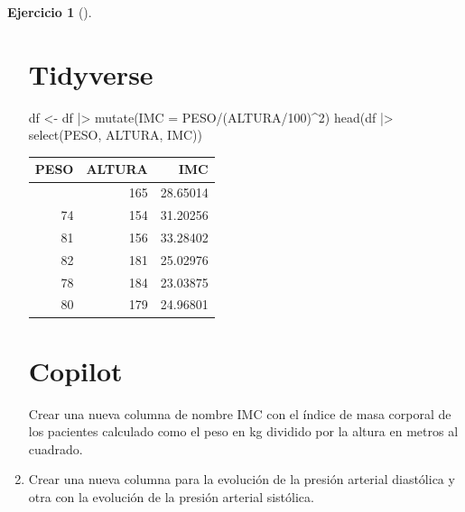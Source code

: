 \documentclass[
  a4paper,
]{scrreport}
\newenvironment{Shaded}{\begin{snugshade}}{\end{snugshade}}
\newcommand{\AttributeTok}[1]{\textcolor[rgb]{0.40,0.45,0.13}{#1}}
\newcommand{\DecValTok}[1]{\textcolor[rgb]{0.68,0.00,0.00}{#1}}
\newcommand{\ExtensionTok}[1]{\textcolor[rgb]{0.00,0.23,0.31}{#1}}
\newcommand{\FunctionTok}[1]{\textcolor[rgb]{0.28,0.35,0.67}{#1}}
\newcommand{\NormalTok}[1]{\textcolor[rgb]{0.00,0.23,0.31}{#1}}
\newcommand{\OtherTok}[1]{\textcolor[rgb]{0.00,0.23,0.31}{#1}}
\newcommand{\SpecialCharTok}[1]{\textcolor[rgb]{0.37,0.37,0.37}{#1}}
\theoremstyle{definition}
\newtheorem{exercise}{Ejercicio}[chapter]
\theoremstyle{remark}
\begin{document}
\begin{exercise}[]
\begin{enumerate}
\begin{tcolorbox}
  \section{Tidyverse}

\begin{Shaded}
\begin{Highlighting}[]
\NormalTok{df }\OtherTok{\textless{}{-}}\NormalTok{ df }\SpecialCharTok{|\textgreater{}} \FunctionTok{mutate}\NormalTok{(}\AttributeTok{IMC =}\NormalTok{ PESO}\SpecialCharTok{/}\NormalTok{(ALTURA}\SpecialCharTok{/}\DecValTok{100}\NormalTok{)}\SpecialCharTok{\^{}}\DecValTok{2}\NormalTok{)}
\FunctionTok{head}\NormalTok{(df }\SpecialCharTok{|\textgreater{}} \FunctionTok{select}\NormalTok{(PESO, ALTURA, IMC))}
\end{Highlighting}
\end{Shaded}

  \begin{longtable}[]{@{}rrr@{}}
  \toprule\noalign{}
  PESO & ALTURA & IMC \\
  \midrule\noalign{}
  \endhead
  \bottomrule\noalign{}
  \endlastfoot
  78 & 165 & 28.65014 \\
  74 & 154 & 31.20256 \\
  81 & 156 & 33.28402 \\
  82 & 181 & 25.02976 \\
  78 & 184 & 23.03875 \\
  80 & 179 & 24.96801 \\
  \end{longtable}

  \section{Copilot}

\begin{Shaded}
\begin{Highlighting}[]
\ExtensionTok{Crear}\NormalTok{ una nueva columna de nombre IMC con el índice de masa corporal de los pacientes calculado como el peso en kg dividido por la altura en metros al cuadrado.}
\end{Highlighting}
\end{Shaded}

  \end{tcolorbox}
\item
  Crear una nueva columna para la evolución de la presión arterial
  diastólica y otra con la evolución de la presión arterial sistólica.

  \begin{tcolorbox}[enhanced jigsaw, colframe=quarto-callout-tip-color-frame, toprule=.15mm, bottomtitle=1mm, breakable, opacitybacktitle=0.6, toptitle=1mm, colback=white, bottomrule=.15mm, title=\textcolor{quarto-callout-tip-color}{\faLightbulb}\hspace{0.5em}{Solución}, arc=.35mm, left=2mm, titlerule=0mm, rightrule=.15mm, coltitle=black, leftrule=.75mm, opacityback=0, colbacktitle=quarto-callout-tip-color!10!white]


\end{tcolorbox}
\end{enumerate}
\end{exercise}
\end{document}
